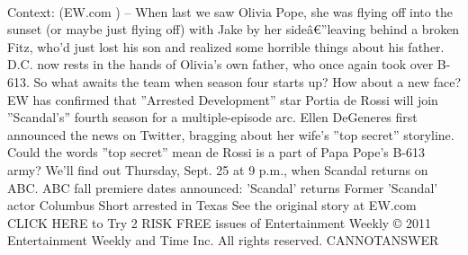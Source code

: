 \documentclass[11pt,a4paper, onecolumn]{article}
\begin{document}
\\ Context: (EW.com ) -- When last we saw Olivia Pope, she was flying off into the sunset (or maybe just flying off) with Jake by her sideâ€”leaving behind a broken Fitz, who'd just lost his son and realized some horrible things about his father. D.C. now rests in the hands of Olivia's own father, who once again took over B-613. So what awaits the team when season four starts up? How about a new face? EW has confirmed that ''Arrested Development'' star Portia de Rossi will join ''Scandal's'' fourth season for a multiple-episode arc. Ellen DeGeneres first announced the news on Twitter, bragging about her wife's ''top secret'' storyline. Could the words ''top secret'' mean de Rossi is a part of Papa Pope's B-613 army? We'll find out Thursday, Sept. 25 at 9 p.m., when Scandal returns on ABC. ABC fall premiere dates announced: 'Scandal' returns Former 'Scandal' actor Columbus Short arrested in Texas See the original story at EW.com CLICK HERE to Try 2 RISK FREE issues of Entertainment Weekly © 2011 Entertainment Weekly and Time Inc. All rights reserved. CANNOTANSWER
\end{document}
